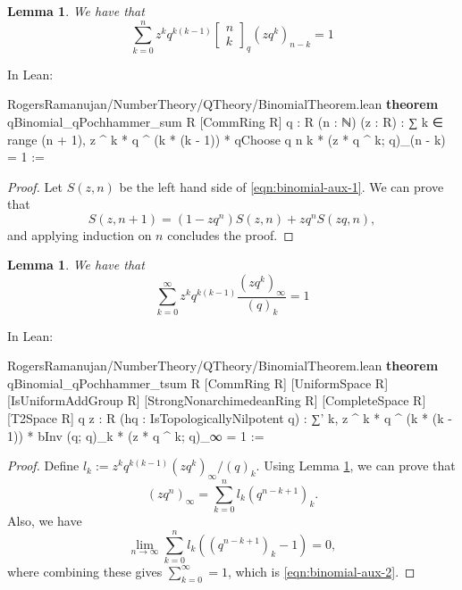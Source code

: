 \documentclass[12pt]{amsart}
\newtheorem{lemma}[theorem]{Lemma}
\theoremstyle{definition}
\theoremstyle{remark}
\numberwithin{equation}{subsection}
\newcommand{\kw}[1]{\textcolor{keywordcolor}{\textbf{#1}}}
\newcommand{\var}[1]{\textcolor{tacticcolor}{#1}}
\newcommand{\num}[1]{\textcolor{numcolor}{#1}}
\newcommand{\imp}[1]{\textcolor{commentcolor}{\textbraceleft#1\textbraceright}}
\begin{document}
\begin{lemma} We have that
\label{lem:binomial-aux-1}
    \begin{equation}
    \label{eqn:binomial-aux-1}
        \sum_{k=0}^{n} z^k q^{k(k-1)} \begin{bmatrix} n \\ k \end{bmatrix}_q (zq^k)_{n-k} = 1
    \end{equation}
\end{lemma}

In Lean:

\begin{code}{RogersRamanujan/NumberTheory/QTheory/BinomialTheorem.lean}
\kw{theorem} qBinomial_qPochhammer_sum \imp{R} [CommRing \var{R}] \imp{q : R} (\var{n} : ℕ) (\var{z} : \var{R}) :
  ∑ \var{k} ∈ range (\var{n} + \num{1}),
    \var{z} ^ \var{k} * \var{q} ^ (\var{k} * (\var{k} - \num{1})) * qChoose \var{q} \var{n} \var{k} * (\var{z} * \var{q} ^ \var{k}; \var{q})_(\var{n} - \var{k}) = \num{1} :=
\end{code}
\begin{proof}
    Let $S(z, n)$ be the left hand side of \eqref{eqn:binomial-aux-1}.
    We can prove that
    \begin{equation}S(z, n+1) = (1 - zq^{n}) S(z, n) + zq^{n} S(zq, n),\end{equation} and applying induction on $n$ concludes the proof.
\end{proof}

\begin{lemma} We have that
\label{lem:binomial-aux-2}
    \begin{equation}
    \label{eqn:binomial-aux-2}
        \sum_{k=0}^{\infty} z^k q^{k(k-1)} \frac{(zq^k)_\infty}{(q)_k} = 1
    \end{equation}
\end{lemma}

In Lean:

\begin{code}{RogersRamanujan/NumberTheory/QTheory/BinomialTheorem.lean}
\kw{theorem} qBinomial_qPochhammer_tsum \imp{R} [CommRing \var{R}] [UniformSpace \var{R}]
  [IsUniformAddGroup \var{R}] [StrongNonarchimedeanRing \var{R}] [CompleteSpace \var{R}] [T2Space \var{R}]
  \imp{q z : R} (\var{hq} : IsTopologicallyNilpotent \var{q}) :
  ∑' \var{k}, \var{z} ^ \var{k} * \var{q} ^ (\var{k} * (\var{k} - \num{1})) * bInv (\var{q}; \var{q})_\var{k} * (\var{z} * \var{q} ^ \var{k}; \var{q})_∞ = \num{1} :=
\end{code}
\begin{proof}
    Define $l_k := z^k q^{k(k-1)} (zq^k)_\infty / (q)_k$. Using Lemma \ref{lem:binomial-aux-1}, we can prove that
    \begin{equation}
        (zq^n)_\infty = \sum_{k=0}^n l_k (q^{n-k+1})_k.
    \end{equation}
    Also, we have
    \begin{equation}
        \lim_{n \to \infty} \sum_{k=0}^{n} l_k ((q^{n-k+1})_k - 1) = 0,
    \end{equation}
    where combining these gives $\sum_{k=0}^{\infty} = 1$, which is \eqref{eqn:binomial-aux-2}.
\end{proof}
\end{document}
